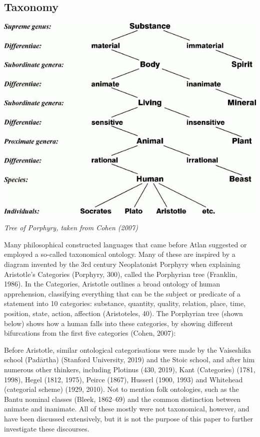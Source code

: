 \subsection{Taxonomy}

\vspace{0.3cm}
\begin{center}
\includegraphics[scale=0.5]{./Images/tree.jpeg}

{\footnotesize \it Tree of Porphyry, taken from Cohen (2007)}
\end{center}

\noindent Many philosophical constructed languages that came before Atlan suggested or employed a so-called taxonomical ontology. Many of these are inspired by a diagram invented by the 3rd century Neoplatonist Porphyry when explaining Aristotle’s Categories (Porphyry, 300), called the Porphyrian tree (Franklin, 1986). In the Categories, Aristotle outlines a broad ontology of human apprehension, classifying everything that can be the subject or predicate of a statement into 10 categories: substance, quantity, quality, relation, place, time, position, state, action, affection (Aristoteles, 40). The Porphyrian tree (shown below) shows how a human falls into these categories, by showing different bifurcations from the first five categories (Cohen, 2007): 

Before Aristotle, similar ontological categorisations were made by the Vaiseshika school (Padārtha) (Stanford University, 2019) and the Stoic school, and after him numerous other thinkers, including Plotinus (430, 2019), Kant (Categories) (1781, 1998), Hegel  (1812, 1975), Peirce (1867), Husserl (1900, 1993) and Whitehead (categorial scheme) (1929, 2010). Not to mention folk ontologies, such as the Bantu nominal classes (Bleek, 1862–69) and the common distinction between animate and inanimate. All of these mostly were not taxonomical, however, and have been discussed extensively, but it is not the purpose of this paper to further investigate these discourses.  

